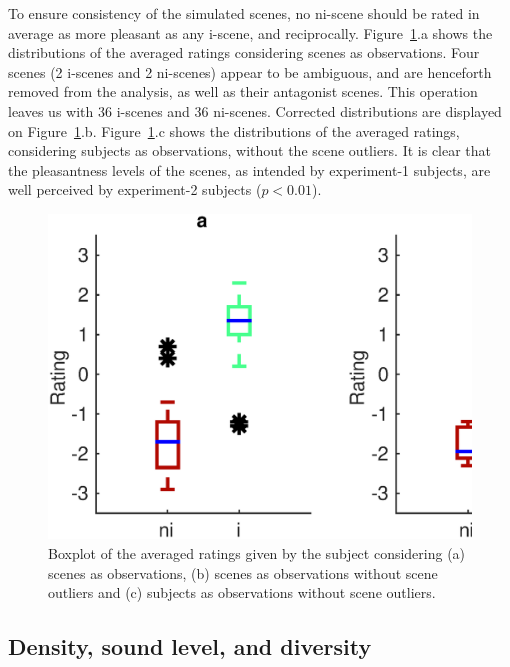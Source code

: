 \documentclass[twoside,twocolumn]{article}
\begin{document}
To ensure consistency of the simulated scenes, no ni-scene should be rated in average as more pleasant as any i-scene, and reciprocally. Figure~\ref{xp2_1}.a shows the distributions of the averaged ratings considering scenes as observations. Four scenes (2 i-scenes and 2 ni-scenes) appear to be ambiguous, and are henceforth removed from the analysis, as well as their antagonist scenes. This operation leaves us with 36 i-scenes and 36 ni-scenes. Corrected distributions are displayed on Figure~\ref{xp2_1}.b. Figure~\ref{xp2_1}.c shows the distributions of the averaged ratings, considering subjects as observations, without the scene outliers. It is clear that the pleasantness levels of the scenes, as intended by experiment-1 subjects, are well perceived by experiment-2 subjects ($p<0.01$).

\begin{figure}[t]
\begin{center}
\includegraphics[width=\columnwidth]{../gfxMatlab/xp2_1.eps}
\caption{\label{xp2_1} Boxplot of the averaged ratings given by the subject considering (a) scenes as observations, (b) scenes as observations without scene outliers and (c) subjects as observations without scene outliers.  } 
\end{center}
\end{figure}


\subsection{Density, sound level,  and diversity}
\label{sec:levelDensityDiversity}
\end{document}
